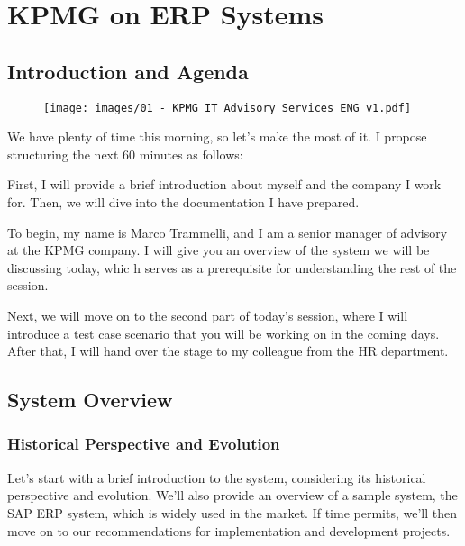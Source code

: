 \section{KPMG on ERP Systems}\label{technical-presentation}

\subsection{Introduction and Agenda}\label{introduction-and-agenda}

\begin{figure}[!h]
  \centering
  \texttt{[image: images/01 - KPMG\_IT Advisory Services\_ENG\_v1.pdf]}
\end{figure}

We have plenty of time this morning, so let's make the most of it. I
propose structuring the next 60 minutes as follows:

First, I will provide a brief introduction about myself and the company
I work for. Then, we will dive into the documentation I have prepared.

To begin, my name is Marco Trammelli, and I am a senior manager of advisory at the KPMG company. I will give you an overview of the system we
will be discussing today, whic  h serves as a prerequisite for
understanding the rest of the session.

Next, we will move on to the second part of today's session, where I
will introduce a test case scenario that you will be working on in the
coming days. After that, I will hand over the stage to my colleague from
the HR department.

\subsection{System Overview}\label{system-overview}

\subsubsection{Historical Perspective and
  Evolution}\label{historical-perspective-and-evolution}

Let's start with a brief introduction to the system, considering its
historical perspective and evolution. We'll also provide an overview of
a sample system, the SAP ERP system, which is widely used in the
market. If time permits, we'll then move on to our recommendations for
implementation and development projects.

